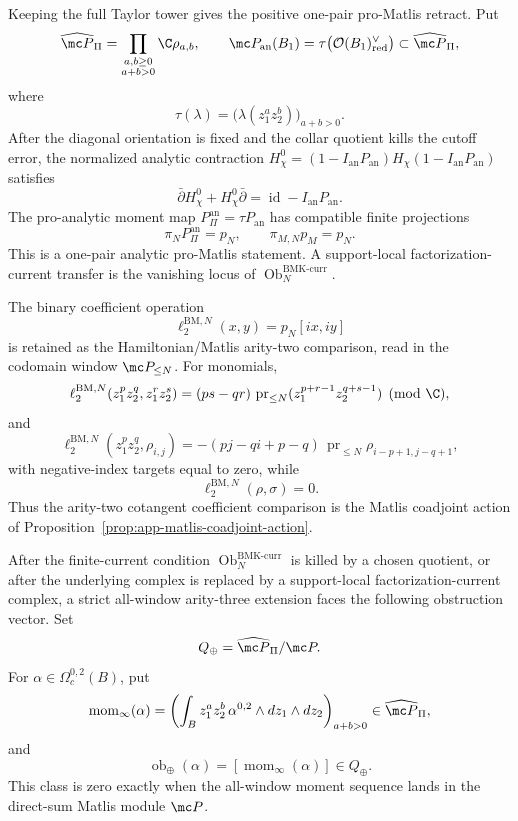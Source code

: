 \begin{thm}
  Keeping the full Taylor tower gives the positive one-pair pro-Matlis
  retract.  Put
  \[
    \widehat{\mc P}_{\Pi}
      =
      \prod_{\substack{a,b\geq0\\a+b>0}}\C\rho_{a,b},
    \qquad
    \mc P_{\mathrm{an}}(B_1)
      =
      \tau\bigl(\mathcal O(B_1)^\vee_{\mathrm{red}}\bigr)
      \subset\widehat{\mc P}_{\Pi},
  \]
  where
  \[
    \tau(\lambda)
      =
      \bigl(\lambda(z_1^az_2^b)\bigr)_{a+b>0}.
  \]
  After the diagonal orientation is fixed and the collar quotient kills
  the cutoff error, the normalized analytic contraction
  \(H_\chi^0=(1-I_{\mathrm{an}}P_{\mathrm{an}})
  H_\chi(1-I_{\mathrm{an}}P_{\mathrm{an}})\) satisfies
  \[
    \bar\partial H_\chi^0+H_\chi^0\bar\partial
    =
    \operatorname{id}-I_{\mathrm{an}}P_{\mathrm{an}}.
  \]
  The pro-analytic moment map
  \(P_{\Pi}^{\mathrm{an}}=\tau P_{\mathrm{an}}\) has compatible finite
  projections
  \[
    \pi_NP_{\Pi}^{\mathrm{an}}=p_N,\qquad
    \pi_{M,N}p_M=p_N .
  \]
  This is a one-pair analytic pro-Matlis statement.  A support-local
  factorization-current transfer is the vanishing locus of
  \(\operatorname{Ob}^{\mathrm{BMK\mbox{-}curr}}_N\).

  The binary coefficient operation
  \[
    \ell^{\mathrm{BM},N}_2(x,y)=p_N[ix,iy]
  \]
  is retained as the Hamiltonian/Matlis arity-two comparison, read in the
  codomain window \(\mc P_{\leq N}\).  For monomials,
  \[
    \ell^{\mathrm{BM},N}_2
    (z_1^pz_2^q,z_1^rz_2^s)
      =
      (ps-qr)\,
      \operatorname{pr}_{\leq N}
      (z_1^{p+r-1}z_2^{q+s-1})
      \pmod{\C},
  \]
  and
  \[
    \ell^{\mathrm{BM},N}_2(z_1^pz_2^q,\rho_{i,j})
      =
      -(pj-qi+p-q)\,
      \operatorname{pr}_{\leq N}
      \rho_{i-p+1,j-q+1},
  \]
  with negative-index targets equal to zero, while
  \[
    \ell^{\mathrm{BM},N}_2(\rho,\sigma)=0 .
  \]
  Thus the arity-two cotangent coefficient comparison is the Matlis
  coadjoint action of
  Proposition~\ref{prop:app-matlis-coadjoint-action}.

  After the finite-current condition
  \(\operatorname{Ob}^{\mathrm{BMK\mbox{-}curr}}_N\) is killed by a
  chosen quotient, or after the underlying complex is replaced by a
  support-local factorization-current complex, a strict all-window
  arity-three extension faces the following obstruction vector.  Set
  \[
    Q_{\oplus}=\widehat{\mc P}_{\Pi}/\mc P .
  \]
  For \(\alpha\in\Omega_c^{0,2}(B)\), put
  \[
    \operatorname{mom}_{\infty}(\alpha)
      =
      \left(
        \int_B z_1^az_2^b\,
        \alpha^{0,2}\wedge dz_1\wedge dz_2
      \right)_{a+b>0}
      \in\widehat{\mc P}_{\Pi},
  \]
  and
  \[
    \operatorname{ob}_{\oplus}(\alpha)
      =
      [\operatorname{mom}_{\infty}(\alpha)]
      \in Q_{\oplus} .
  \]
  This class is zero exactly when the all-window moment sequence lands in
  the direct-sum Matlis module \(\mc P\).


\end{thm}
